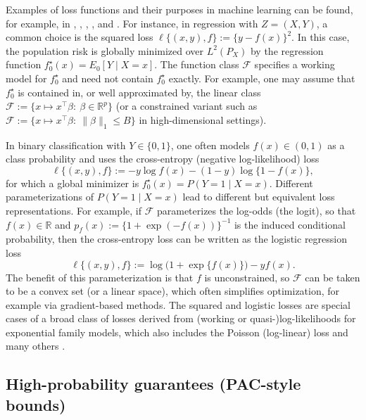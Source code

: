 \documentclass[11pt]{article}
\theoremstyle{plain}
\theoremstyle{definition} %
\begin{document}
 

 

 




 





Examples of loss functions and their purposes in machine learning can be found,
for example, in \citet{hastie2009elements}, \citet{james2013introduction},
\citet{shalev2014understanding}, \citet{wainwright2019high}, and
\citet{foster2023orthogonal}. For instance, in regression with \(Z=(X,Y)\), a
common choice is the squared loss \(\ell\{(x,y),f\}:=\{y-f(x)\}^2\). In this
case, the population risk is globally minimized over \(L^2(P_X)\) by the
regression function \(f_0^\star(x)=E_0[Y\mid X=x]\). The function class
\(\mathcal F\) specifies a working model for \(f_0^\star\) and need not contain
\(f_0^\star\) exactly. For example, one may assume that \(f_0^\star\) is
contained in, or well approximated by, the linear class
\(\mathcal F:=\{x\mapsto x^\top\beta:\ \beta\in\mathbb R^p\}\) (or a constrained
variant such as \(\mathcal F:=\{x\mapsto x^\top\beta:\ \|\beta\|_1\le B\}\) in
high-dimensional settings).

In binary classification with \(Y\in\{0,1\}\), one often models \(f(x)\in(0,1)\)
as a class probability and uses the cross-entropy (negative log-likelihood) loss
\[
\ell\{(x,y),f\}:= -y\log f(x) - (1-y)\log\{1-f(x)\},
\]
for which a global minimizer is \(f_0^\star(x)=P(Y=1\mid X=x)\). Different
parameterizations of \(P(Y=1\mid X=x)\) lead to different but equivalent loss
representations. For example, if \(\mathcal F\) parameterizes the log-odds (the
logit), so that \(f(x)\in\mathbb R\) and
\(p_f(x):=\{1+\exp(-f(x))\}^{-1}\) is the induced conditional probability, then
the cross-entropy loss can be written as the logistic regression loss
\[
\ell\{(x,y),f\}:=\log\bigl(1+\exp\{f(x)\}\bigr)-y f(x).
\]
The benefit of this parameterization is that \(f\) is unconstrained, so
\(\mathcal F\) can be taken to be a convex set (or a linear space), which often
simplifies optimization, for example via gradient-based methods. The squared and
logistic losses are special cases of a broad class of losses derived from
(working or quasi-)log-likelihoods for exponential family models, which also
includes the Poisson (log-linear) loss and many others \citep{hastie2009elements}.

 


\subsection{High-probability guarantees (PAC-style bounds)}
\end{document}
